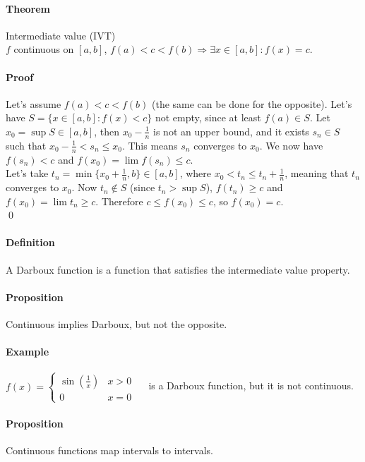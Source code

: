 \documentclass{article}
\newcommand{\intcc}[1]{\left[#1\right]}
\newcommand{\Def}{\paragraph{Definition}}
\newcommand{\Proposition}{\paragraph{Proposition}}
\newcommand{\Theorem}{\paragraph{Theorem}}
\newcommand{\Proof}{\paragraph{Proof}}
\newcommand{\Example}{\paragraph{Example}}
\begin{document}
	\Theorem Intermediate value (IVT)
\\$f$ continuous on $\intcc{a,b}$, $f(a) < c < f(b) \Rightarrow \exists x \in
	\intcc{a,b} : f(x) = c$.

	\Proof Let's assume $f(a) < c < f(b)$ (the same can be done for the opposite).
	Let's have $S = \{ x \in \intcc{a,b} : f(x) < c \}$ not empty, since at least
	$f(a) \in S$. Let $x_0 = \sup S \in \intcc{a,b}$, then $x_0 - \frac{1}{n}$ is
	not an upper bound, and it exists $s_n \in S$ such that $x_0 - \frac{1}{n} <
	s_n \leq x_0$. This means $s_n$ converges to $x_0$. We now have $f(s_n) < c$
	and $f(x_0) = \lim f(s_n) \leq c$.
\\Let's take $t_n = \min \{ x_0 + \frac{1}{n}, b \} \in \intcc{a,b}$, where
	$x_0 < t_n \leq t_n + \frac{1}{n}$, meaning that $t_n$ converges to $x_0$. Now
	$t_n \notin S$ (since $t_n > \sup S$), $f(t_n) \geq c$ and $f(x_0) = \lim t_n
	\geq c$. Therefore $c \leq f(x_0) \leq c$, so $f(x_0) = c$.
\\\qed

	\Def A Darboux function is a function that satisfies the intermediate value
	property.

	\Proposition Continuous implies Darboux, but not the opposite.


	\Example $f(x) = \begin{cases}\sin(\frac{1}{x}) & x > 0 \\ 0 & x = 0\end{cases}
	\quad$ is a Darboux function, but it is not continuous.

	\Proposition Continuous functions map intervals to intervals.

\end{document}
